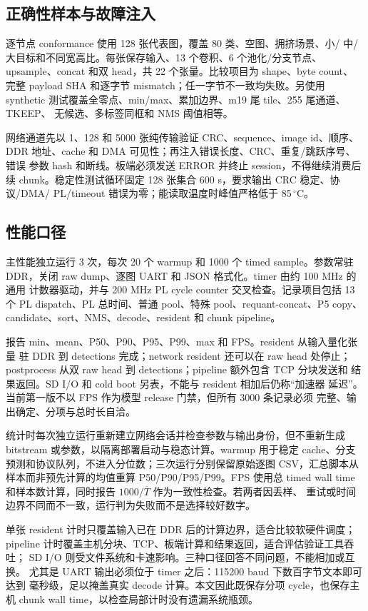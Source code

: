 \subsection{正确性样本与故障注入}

逐节点 conformance 使用 128 张代表图，覆盖 80 类、空图、拥挤场景、小/
中/大目标和不同宽高比。每张保存输入、13 个卷积、6 个池化/分支节点、
upsample、concat 和双 head，共 22 个张量。比较项目为 shape、byte count、
完整 payload SHA 和逐字节 mismatch；任一字节不一致均失败。另使用 synthetic
测试覆盖全零点、min/max、累加边界、m19 尾 tile、255 尾通道、TKEEP、
无候选、多标签同框和 NMS 阈值相等。

网络通道先以 1、128 和 5000 张纯传输验证 CRC、sequence、image id、顺序、
DDR 地址、cache 和 DMA 可见性；再注入错误长度、CRC、重复/跳跃序号、错误
参数 hash 和断线。板端必须发送 ERROR 并终止 session，不得继续消费后续
chunk。稳定性测试循环固定 128 张集合 600 s，要求输出 CRC 稳定、协议/DMA/
PL/timeout 错误为零；能读取温度时峰值严格低于 85\,$^\circ$C。

\subsection{性能口径}

主性能独立运行 3 次，每次 20 个 warmup 和 1000 个 timed sample。参数常驻
DDR，关闭 raw dump、逐图 UART 和 JSON 格式化。timer 由约 100 MHz 的通用
计数器驱动，并与 200 MHz PL cycle counter 交叉检查。记录项目包括 13 个
PL dispatch、PL 总时间、普通 pool、特殊 pool、requant-concat、P5 copy、
candidate、sort、NMS、decode、resident 和 chunk pipeline。

报告 min、mean、P50、P90、P95、P99、max 和 FPS。resident 从输入量化张量
驻 DDR 到 detections 完成；network resident 还可以在 raw head 处停止；
postprocess 从双 raw head 到 detections；pipeline 额外包含 TCP 分块发送和
结果返回。SD I/O 和 cold boot 另表，不能与 resident 相加后仍称“加速器
延迟”。当前第一版不以 FPS 作为模型 release 门禁，但所有 3000 条记录必须
完整、输出确定、分项与总时长自洽。

统计时每次独立运行重新建立网络会话并检查参数与输出身份，但不重新生成
bitstream 或参数，以隔离部署启动与稳态计算。warmup 用于稳定 cache、分支
预测和协议队列，不进入分位数；三次运行分别保留原始逐图 CSV，汇总脚本从
样本而非预先计算的均值重算 P50/P90/P95/P99。FPS 使用总 timed wall time
和样本数计算，同时报告 $1000/\overline{T}$ 作为一致性检查。若两者因丢样、
重试或时间边界不同而不一致，运行判为失败而不是选择较好数字。

单张 resident 计时只覆盖输入已在 DDR 后的计算边界，适合比较软硬件调度；
pipeline 计时覆盖主机分块、TCP、板端计算和结果返回，适合评估验证工具吞吐；
SD I/O 则受文件系统和卡速影响。三种口径回答不同问题，不能相加或互换。
尤其是 UART 输出必须位于 timer 之后：115200 baud 下数百字节文本即可达到
毫秒级，足以掩盖真实 decode 计算。本文因此既保存分项 cycle，也保存主机
chunk wall time，以检查局部计时没有遗漏系统瓶颈。

